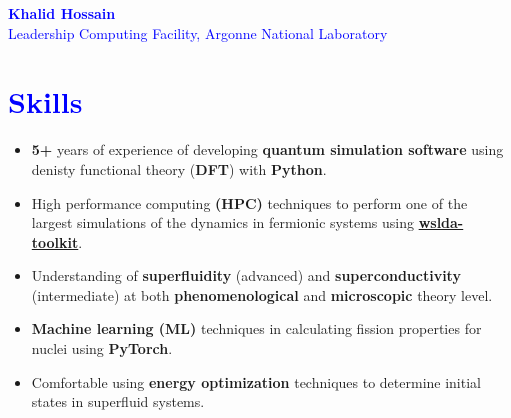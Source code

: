 \documentclass[10pt,fleqn]{scrartcl}
\begin{document}
\noindent
\textcolor{blue}{\LARGE{\textbf{Khalid Hossain}}} \\
\textcolor{blue}{\large{Leadership Computing Facility, Argonne National 
Laboratory}}
\noindent
\section*{\textcolor{blue}{Skills}}
\begin{itemize}
     \item \textbf{5+} years of experience of developing 
         \textbf{quantum simulation software} 
        using denisty functional theory (\textbf{DFT}) with 
        \textbf{Python}.
    \item High performance computing \textbf{(HPC)} techniques to 
        perform one of the largest simulations of the dynamics in fermionic 
        systems using 
        \textcolor{blue}{\textbf{\href{https://gitlab.fizyka.pw.edu.pl/wtools/wslda}{wslda-toolkit}}}.
	\item Understanding of \textbf{superfluidity} (advanced) and 
        \textbf{superconductivity} (intermediate) at both 
        \textbf{phenomenological} and \textbf{microscopic} theory level.
    \item \textbf{Machine learning (ML)} techniques in calculating fission 
        properties for nuclei using \textbf{PyTorch}.
    \item Comfortable using \textbf{energy optimization} techniques to 
        determine initial states in superfluid systems. 
\end{itemize}

\noindent
\end{document}
